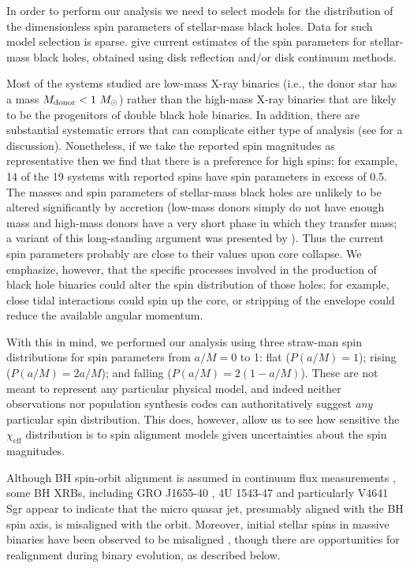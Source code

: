 \documentclass[modern,linenumbers]{aastex61}
\newcommand{\chieff}{\chi_\mathrm{eff}}
\begin{document}
In order to perform our analysis we need to select models for the
distribution of the dimensionless spin parameters of stellar-mass
black holes.  Data for such model selection is sparse.
\citet{2015PhR...548....1M} give current estimates of the spin
parameters for stellar-mass black holes, obtained using disk
reflection and/or disk continuum methods.

Most of the systems studied are low-mass X-ray binaries (i.e., the
donor star has a mass $M_{\rm donor}<1~M_\odot$) rather than the
high-mass X-ray binaries that are likely to be the progenitors of
double black hole binaries.  In addition, there are substantial
systematic errors that can complicate either type of analysis (see
\citealt{2015PhR...548....1M} for a discussion). Nonetheless, if we
take the reported spin magnitudes as representative then we find that
there is a preference for high spins; for example, 14 of the 19
systems with reported spins have spin parameters in excess of 0.5.
The masses and spin parameters of stellar-mass black holes are
unlikely to be altered significantly by accretion (low-mass donors
simply do not have enough mass and high-mass donors have a very short
phase in which they transfer mass; a variant of this long-standing
argument was presented by \citet{1999MNRAS.305..654K}).  Thus the
current spin parameters probably are close to their values upon core
collapse.  We emphasize, however, that the specific processes involved
in the production of black hole binaries could alter the spin
distribution of those holes: for example, close tidal interactions
could spin up the core, or stripping of the envelope could reduce the
available angular momentum.

With this in mind, we performed our analysis using three straw-man
spin distributions for spin parameters from $a/M=0$ to 1: flat
($P(a/M)=1$); rising ($P(a/M)=2a/M$); and falling ($P(a/M)=2(1-a/M)$).
These are not meant to represent any particular physical model, and
indeed neither observations nor population synthesis codes can
authoritatively suggest {\it any} particular spin distribution.  This
does, however, allow us to see how sensitive the $\chieff$
distribution is to spin alignment models given uncertainties about the
spin magnitudes.

Although BH spin-orbit alignment is assumed in continuum flux
measurements \citep{2015PhR...548....1M}, some BH XRBs, including GRO
J1655-40 \citep{Martin:2008}, 4U 1543-47 \citep{MorningstarMiller:2014} and particularly V4641 Sgr \citep{Orosz:2001,Martin:2008b} appear to indicate that the micro
quasar jet, presumably aligned with the BH spin axis, is misaligned
with the orbit.  Moreover, initial stellar spins in massive binaries
have been observed to be misaligned \citep[e.g.,][]{Albrecht:2009}, though there are
opportunities for realignment during binary evolution, as described
below.
\end{document}
